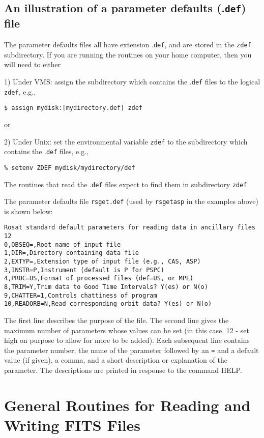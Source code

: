 \section{An illustration of a parameter defaults (.{\tt def}) file}
 
The parameter defaults files all have extension .{\tt def}, and are stored in the
{\tt zdef} subdirectory. If you are running the routines on your home computer,
then you will need to either
 
1) Under VMS: assign the subdirectory which contains the .{\tt def} files to the
logical {\tt zdef}, e.g.,

\medskip\noindent
\begin{verbatim}
$ assign mydisk:[mydirectory.def] zdef
\end{verbatim}
or
 
2) Under Unix: set the environmental variable {\tt zdef} to the subdirectory
which contains the .{\tt def} files, e.g.,

\medskip\noindent
\begin{verbatim}
% setenv ZDEF mydisk/mydirectory/def
\end{verbatim}
The routines that read the .{\tt def} files expect to find them in subdirectory
{\tt zdef}.
 
The parameter defaults file {\tt rsget.def} (used by {\tt rsgetasp} in the examples
above) is shown below:

\medskip\noindent
\begin{verbatim}
Rosat standard default parameters for reading data in ancillary files
12
0,OBSEQ=,Root name of input file
1,DIR=,Directory containing data file
2,EXTYP=,Extension type of input file (e.g., CAS, ASP)
3,INSTR=P,Instrument (default is P for PSPC)
4,PROC=US,Format of processed files (def=US, or MPE)
8,TRIM=Y,Trim data to Good Time Intervals? Y(es) or N(o)
9,CHATTER=1,Controls chattiness of program
10,READORB=N,Read corresponding orbit data? Y(es) or N(o)
\end{verbatim}
The first line describes the purpose of the file. The second line gives the
maximum number of parameters whose values can be set (in this case, 12 -
set high on purpose to allow for more to be added). Each subsequent line
contains the parameter number, the name of the parameter followed by an {\tt =}
and a default value (if given), a comma, and a short description or
explanation of the parameter. The descriptions are printed in response to
the command HELP.
 
\chapter{General Routines for Reading and Writing FITS Files }
 
